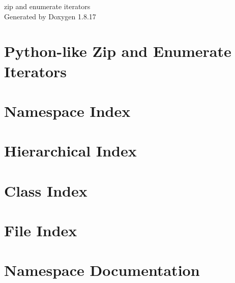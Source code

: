 \let\mypdfximage\pdfximage\def\pdfximage{\immediate\mypdfximage}\documentclass[twoside]{book}
\newcommand{\+}{\discretionary{\mbox{\scriptsize$\hookleftarrow$}}{}{}}
\newcommand{\clearemptydoublepage}{%
  \newpage{\pagestyle{empty}\cleardoublepage}%
}
\begin{document}
\hypersetup{pageanchor=false,
             bookmarksnumbered=true,
             pdfencoding=unicode
            }
\begin{titlepage}
\vspace*{7cm}
\begin{center}%
{\Large zip and enumerate iterators }\\
\vspace*{1cm}
{\large Generated by Doxygen 1.8.17}\\
\end{center}
\end{titlepage}
\clearemptydoublepage
{}
\tableofcontents
\clearemptydoublepage
{}
\hypersetup{pageanchor=true}

\chapter{Python-\/like Zip and Enumerate Iterators}
\label{index}\hypertarget{index}{}
\chapter{Namespace Index}

\chapter{Hierarchical Index}

\chapter{Class Index}

\chapter{File Index}

\chapter{Namespace Documentation}



\end{document}
